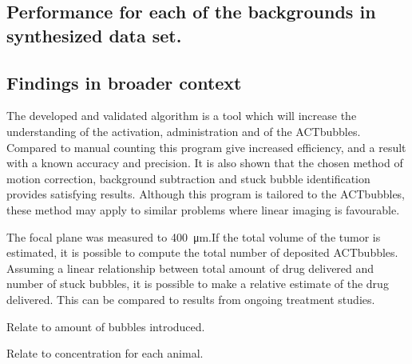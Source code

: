 \subsection{Performance for each of the backgrounds in synthesized data set.}

\subsection{Findings in broader context}
The developed and validated algorithm is a tool which will increase the understanding of the activation, administration and \texttrademark of the ACT\texttrademark bubbles. Compared to manual counting this program give increased efficiency, and a result with a known accuracy and precision. It is also shown that the chosen method of motion correction, background subtraction and stuck bubble identification provides satisfying results. Although this program is tailored to the ACT\texttrademark bubbles, these method may apply to similar problems where linear imaging is favourable. 

The focal plane was measured to \SI{400}{\micro\meter}.If the total volume of the tumor is estimated, it is possible to compute the total number of deposited ACT\texttrademark bubbles. Assuming a linear relationship between total amount of drug delivered and number of stuck bubbles, it is possible to make a relative estimate of the drug delivered. This can be compared to results from ongoing treatment studies.


Relate to amount of bubbles introduced.

Relate to concentration for each animal.

